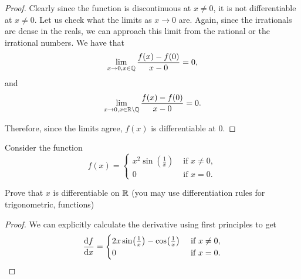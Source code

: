 \documentclass{article}
\begin{document}
    \begin{proof}
        Clearly since the function is discontinuous at $x \neq 0$, it is not differentiable at $x \neq 0$. Let us check what the 
        limits as $x \to 0$ are. Again, since the irrationals are dense in the reals, we can approach this limit
        from the rational or the irrational numbers. 
        We have that 
        \begin{equation*}
            \lim_{x \to 0, x \in \mathbb{Q}} \frac{f(x) - f(0)}{x - 0} = 0,
        \end{equation*}
        and 
        \begin{equation*}
            \lim_{x \to 0, x \in \mathbb{R} \setminus  \mathbb{Q}} \frac{f(x) - f(0)}{x - 0} = 0.
        \end{equation*}
        
        Therefore, since the limits agree, $f(x)$ is differentiable at 0.
    \end{proof}

    \newpage
    Consider the function
    \begin{equation*}
        f(x) = 
        \begin{cases}
            x^{2}\sin(\frac{1}{x}) & \text{ if } x \neq 0,\\
            0 & \text{ if } x = 0.
        \end{cases}
    \end{equation*}

    Prove that $x$ is differentiable on $\mathbb{R}$ (you may use differentiation rules for trigonometric, functions)

    \begin{proof}
        We can explicitly calculate the derivative using first principles to get
        \begin{equation*}
            \dv{f}{x}(x) = 
            \begin{cases}
                2x\sin(\frac{1}{x}) - \cos(\frac{1}{x}) & \text{ if } x \neq 0,\\
                0 & \text{ if } x = 0.
            \end{cases}
        \end{equation*}
        \end{proof}
\end{document}
